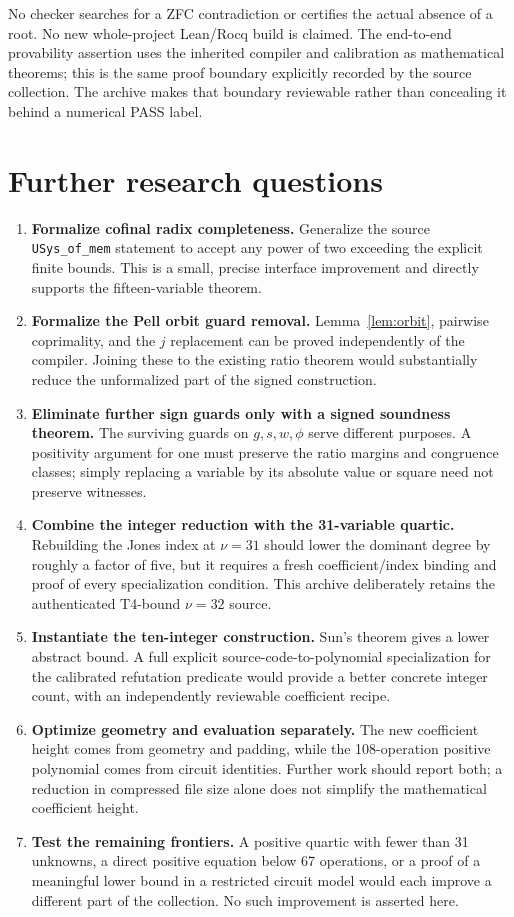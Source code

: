 \documentclass[11pt]{article}
\theoremstyle{definition}\newtheorem{definition}[theorem]{Definition}
\begin{document}
No checker searches for a ZFC contradiction or certifies the actual absence of a root. No new whole-project Lean/Rocq build is claimed. The end-to-end provability assertion uses the inherited compiler and calibration as mathematical theorems; this is the same proof boundary explicitly recorded by the source collection. The archive makes that boundary reviewable rather than concealing it behind a numerical PASS label.

\section{Further research questions}
\begin{enumerate}[leftmargin=*,itemsep=6pt]
\item \textbf{Formalize cofinal radix completeness.} Generalize the source \texttt{USys\_of\_mem} statement to accept any power of two exceeding the explicit finite bounds. This is a small, precise interface improvement and directly supports the fifteen-variable theorem.
\item \textbf{Formalize the Pell orbit guard removal.} Lemma~\ref{lem:orbit}, pairwise coprimality, and the $j$ replacement can be proved independently of the compiler. Joining these to the existing ratio theorem would substantially reduce the unformalized part of the signed construction.
\item \textbf{Eliminate further sign guards only with a signed soundness theorem.} The surviving guards on $g,s,w,\phi$ serve different purposes. A positivity argument for one must preserve the ratio margins and congruence classes; simply replacing a variable by its absolute value or square need not preserve witnesses.
\item \textbf{Combine the integer reduction with the 31-variable quartic.} Rebuilding the Jones index at $\nu=31$ should lower the dominant degree by roughly a factor of five, but it requires a fresh coefficient/index binding and proof of every specialization condition. This archive deliberately retains the authenticated T4-bound $\nu=32$ source.
\item \textbf{Instantiate the ten-integer construction.} Sun's theorem gives a lower abstract bound. A full explicit source-code-to-polynomial specialization for the calibrated refutation predicate would provide a better concrete integer count, with an independently reviewable coefficient recipe.
\item \textbf{Optimize geometry and evaluation separately.} The new coefficient height comes from geometry and padding, while the 108-operation positive polynomial comes from circuit identities. Further work should report both; a reduction in compressed file size alone does not simplify the mathematical coefficient height.
\item \textbf{Test the remaining frontiers.} A positive quartic with fewer than 31 unknowns, a direct positive equation below 67 operations, or a proof of a meaningful lower bound in a restricted circuit model would each improve a different part of the collection. No such improvement is asserted here.
\end{enumerate}
\end{document}
